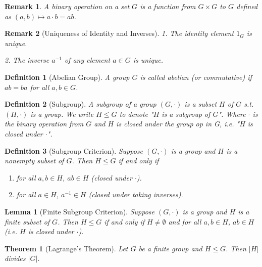 \documentclass[12pt]{article}
\newtheorem{definition}{Definition}[section]
\newtheorem{theorem}{Theorem}[section]
\newtheorem{lemma}{Lemma}[section]
\newtheorem{remark}{Remark}[section]
\begin{document}
\begin{remark} 
    A binary operation on a set $G$ is a function from $G \times G$ to $G$ defined as $(a,b) \mapsto a \cdot b = ab$.
\end{remark}

\begin{remark}[Uniqueness of Identity and Inverses]
        \item 1. The identity element $1_G$ is unique.
        \item 2. The inverse $a^{-1}$ of any element $a \in G$ is unique.
\end{remark}

\begin{definition}[Abelian Group]
A group $G$ is called \emph{abelian} (or commutative) if $ab = ba$ for all $a,b \in G$.
\end{definition}

\begin{definition}[Subgroup]
A subgroup of a group $(G, \cdot)$ is a subset $H$ of $G$ s.t. $(H, \cdot)$ is a group. We write $H\leq G$ to denote "$H$ is a subgroup of $G$". Where $\cdot$ is the binary operation from $G$ and $H$ is closed under the group op in G, i.e. "$H$ is closed under $\cdot$".
\end{definition}

\begin{definition}[Subgroup Criterion]
    Suppose $(G, \cdot)$ is a group and $H$ is a nonempty subset of $G$. Then $H \leq G$ if and only if 
    \begin{enumerate}
        \item for all $a,b \in H$, $ab \in H$ (closed under $\cdot$).
        \item for all $a \in H$, $a^{-1} \in H$ (closed under taking inverses).
    \end{enumerate}
\end{definition}

\begin{lemma}[Finite Subgroup Criterion]
Suppose $(G, \cdot) $ is a group and $H$ is a finite subset of $G$. Then $H \leq G$ if and only if $H \neq \emptyset$ and for all $a,b \in H$, $ab \in H$ (i.e. $H$ is closed under $\cdot$).
\end{lemma}

\begin{theorem}[Lagrange’s Theorem]
Let $G$ be a finite group and $H \leq G$. Then $|H|$ divides $|G|$.
\end{theorem}
\end{document}

